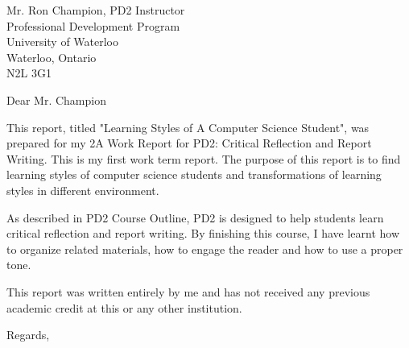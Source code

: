 \documentclass[12pt]{letter}
\begin{document}
\begin{letter}
{Mr. Ron Champion, PD2 Instructor\\
Professional Development Program\\
University of Waterloo\\
Waterloo, Ontario\\
N2L 3G1}

\opening{Dear Mr. Champion}

This report, titled "Learning Styles of A Computer Science Student", was prepared
for my 2A Work Report for PD2: Critical Reflection and Report Writing. This is
my first work term report.  The purpose of this report is to find learning styles of computer science students and transformations of learning styles in different environment.

As described in PD2 Course Outline, PD2 is designed to help students learn critical reflection and report writing. By finishing this course, I have learnt how to organize related materials, how to engage the reader and how to use a proper tone.

This report was written entirely by me and has not received any previous
academic credit at this or any other institution.


\closing{Regards,}
 
\end{letter}
\end{document}
